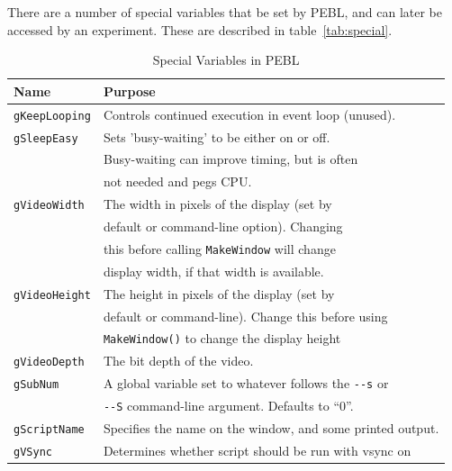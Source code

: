 \vspace{1cm}



There are a number of special variables that be set by PEBL, 
and can later be accessed by an experiment. These are described in table~\ref{tab:special}.

\begin{table}[htbp]
\caption{Special Variables in PEBL}

\begin{tabular}{ll}
\toprule
\textbf{Name}&\textbf{Purpose}\\
\midrule
\verb+gKeepLooping+ & Controls continued execution in event loop (unused). \\
\addlinespace[.2cm]
\verb+gSleepEasy+      &Sets 'busy-waiting' to be either on or off.\\
                       &Busy-waiting can improve timing, but is often\\
                       &not needed and pegs CPU.   \\
\verb+gVideoWidth+  &	The width in pixels of the display (set by\\
             &  default or command-line option). Changing \\
             &  this before calling \verb+MakeWindow+ will change \\
             &  display width, if that width is available. \\
\addlinespace[.2cm]
\verb+gVideoHeight+ & 	The height in pixels of the display (set by\\
             & 	default or command-line). Change this before using \\
             &  \verb+MakeWindow()+ to change the display height\\

\addlinespace[.2cm]
\verb+gVideoDepth+    &      	The bit depth of the video.\\

\addlinespace[.2cm]
\verb+gSubNum+      &  A global variable set to whatever follows the \verb+--s+ or \\
             & \verb+--S+ command-line argument.  Defaults to ``0''.\\
\verb|gScriptName| &Specifies the name on the window, and some printed output.\\
\verb|gVSync| &Determines whether script should be run with vsync on\\


\end{tabular}
\end{table}
